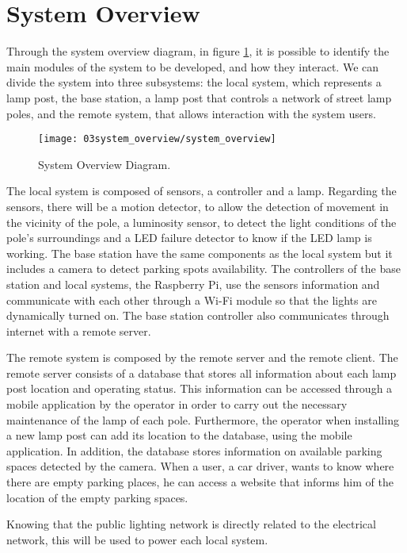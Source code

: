 \section{System Overview}
Through the system overview diagram, in figure \ref{fig:system_overview}, it is possible to identify the main modules of the system to be developed, and how they interact. We can divide the system into three subsystems: the local system, which represents a lamp post, the base station, a lamp post that controls a network of street lamp poles, and the remote system, that allows interaction with the system users.

\begin{figure}[ht]
	\centering
	\texttt{[image: 03system\_overview/system\_overview]}
	\caption{System Overview Diagram.}
	\label{fig:system_overview}
\end{figure}

The local system is composed of sensors, a controller and a lamp. Regarding the sensors, there will be a motion detector, to allow the detection of movement in the vicinity of the pole, a luminosity sensor, to detect the light conditions of the pole’s surroundings and a LED failure detector to know if the LED lamp is working. The base station have the same components as the local system but it includes a camera to detect parking spots availability. The controllers of the base station and local systems, the Raspberry Pi, use the sensors information and communicate with each other through a Wi-Fi module so that the lights are dynamically turned on. The base station controller also communicates through internet with a remote server.

The remote system is composed by the remote server and the remote client. The remote server consists of a database that stores all information about each lamp post location and operating status. This information can be accessed through a mobile application by the operator in order to carry out the necessary maintenance of the lamp of each pole. Furthermore, the operator when installing a new lamp post can add its location to the database, using the mobile application. In addition, the database stores information on available parking spaces detected by the camera. When a user, a car driver, wants to know where there are empty parking places, he can access a website that informs him of the location of the empty parking spaces.

Knowing that the public lighting network is directly related to the electrical network, this will be used to power each local system.

